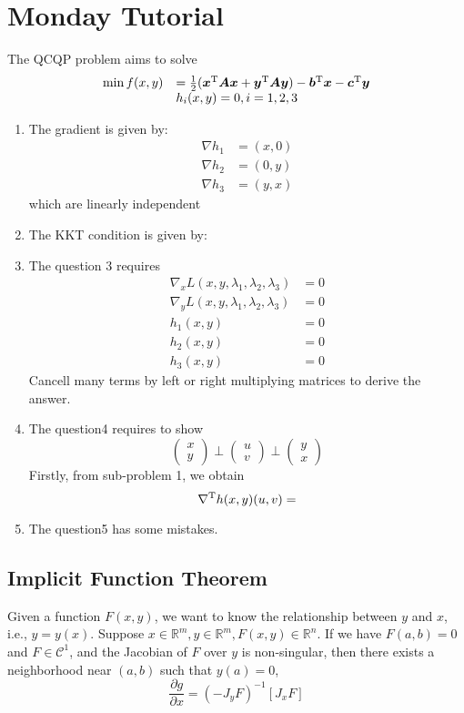 \section{Monday Tutorial}
The QCQP problem aims to solve
\[
\begin{array}{ll}
\min f(x,y)&=\frac{1}{2}(\bm x^{\mathrm T}\bm A\bm x+\bm y^{\mathrm T}\bm A\bm y) - \bm b^{\mathrm T}\bm x-\bm c^{\mathrm T}\bm y\\
&h_i(x,y)=0,i=1,2,3
\end{array}
\]
\begin{enumerate}
\item
The gradient is given by:
\begin{align*}
\nabla h_1&=(x,0)\\
\nabla h_2&=(0,y)\\
\nabla h_3&=(y,x)
\end{align*}
which are linearly independent
\item
The KKT condition is given by:

\item
The question 3 requires
\begin{align*}
\nabla_xL(x,y,\lambda_1,\lambda_2,\lambda_3)&=0\\
\nabla_yL(x,y,\lambda_1,\lambda_2,\lambda_3)&=0\\
h_1(x,y)&=0\\
h_2(x,y)&=0\\
h_3(x,y)&=0
\end{align*}
Cancell many terms by left or right multiplying matrices to derive the answer.
\item
The question4 requires to show
\[
\begin{pmatrix}
x\\y
\end{pmatrix}\perp\begin{pmatrix}
u\\v
\end{pmatrix}\perp\begin{pmatrix}
y\\x
\end{pmatrix}
\]
Firstly, from sub-problem 1, we obtain
\[
\nabla^{\mathrm T} h(x,y)(u,v)=
\]
\item
The question5 has some mistakes.
\end{enumerate}
\subsection{Implicit Function Theorem}
Given a function $F(x,y)$, we want to know the relationship between $y$ and $x$, i.e., $y=y(x)$. Suppose $x\in\mathbb{R}^m,y\in\mathbb{R}^m,F(x,y)\in\mathbb{R}^n$. If we have $F(a,b)=0$ and $F\in\mathcal{C}^1$, and the Jacobian of $F$ over $y$ is non-singular, then there exists a neighborhood near $(a,b)$ such that $y(a)=0$,
\[
\frac{\partial g}{\partial x}=(-J_yF)^{-1}[J_xF]
\]

